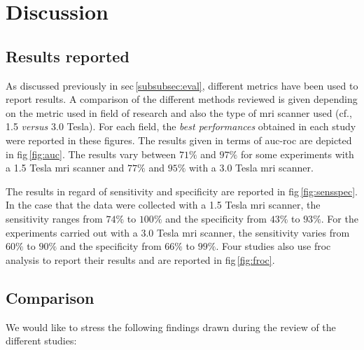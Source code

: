 \section{Discussion} \label{sec:discussion}

\subsection{Results reported}

As discussed previously in \ac{sec}\,\ref{subsubsec:eval}, different metrics have been used to report results. A comparison of the different methods reviewed is given depending on the metric used in field of research and also the type of \ac{mri} scanner used (cf., 1.5 \textit{versus} 3.0 Tesla). For each field, the \textit{best performances} obtained in each study were reported in these figures.
The results given in terms of \ac{auc}-\ac{roc} are depicted in \ac{fig}\,\ref{fig:auc}. The results vary between $71\%$ and $97\%$ for some experiments with a 1.5 Tesla \ac{mri} scanner and $77\%$ and $95\%$ with a 3.0 Tesla \ac{mri} scanner. 

The results in regard of sensitivity and specificity are reported in \ac{fig}\,\ref{fig:sensspec}. In the case that the data were collected with a 1.5 Tesla \ac{mri} scanner, the sensitivity ranges from $74\%$ to $100\%$ and the specificity from $43\%$ to $93\%$. For the experiments carried out with a 3.0 Tesla \ac{mri} scanner, the sensitivity varies from $60\%$ to $90\%$ and the specificity from $66\%$ to $99\%$.
Four studies also use \ac{froc} analysis to report their results and are reported in \ac{fig}\,\ref{fig:froc}.

\subsection{Comparison}

We would like to stress the following findings drawn during the review of the different studies:

